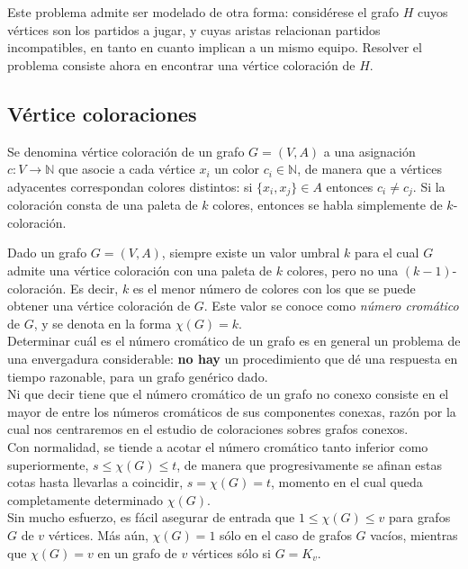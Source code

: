 Este problema admite ser modelado de otra forma: considérese el grafo $H$ cuyos vértices son los partidos a jugar, y cuyas aristas relacionan partidos incompatibles, en tanto en cuanto implican a un mismo equipo. Resolver el problema consiste ahora en encontrar una vértice coloración de $H$.\\

\subsection{Vértice coloraciones}
\label{sec:cromatico}

\begin{fondo}
Se denomina vértice coloración de un grafo $G = (V,A)$ a una asignación $c: V \rightarrow \mathbb{N}$ que asocie a cada vértice $x_i$ un color $c_i \in \mathbb{N}$, de manera que a vértices adyacentes correspondan colores distintos: si $\{x_i,x_j\} \in A$ entonces $c_i \ne c_j$. Si la coloración consta de una paleta de $k$ colores, entonces se habla simplemente de $k$-coloración.
\end{fondo}

Dado un grafo $G = (V,A)$, siempre existe un valor umbral $k$ para el cual $G$ admite una vértice coloración con una paleta de $k$ colores, pero no una $(k-1)$-coloración. Es decir, $k$ es el menor número de colores con los que se puede obtener una vértice coloración de $G$. Este valor se conoce como \emph{número cromático} de $G$, y se denota en la forma $\chi (G) = k$.\\

Determinar cuál es el número cromático de un grafo es en general un problema de una envergadura considerable: \textbf{no hay} un procedimiento que dé una respuesta en tiempo razonable, para un grafo genérico dado.\\

Ni que decir tiene que el número cromático de un grafo no conexo consiste en el mayor de entre los números cromáticos de sus componentes conexas, razón por la cual nos centraremos en el estudio de coloraciones sobres grafos conexos.\\

Con normalidad, se tiende a acotar el número cromático tanto inferior como superiormente, $s \leq \chi (G) \leq t$, de manera que progresivamente se afinan estas cotas hasta llevarlas a coincidir, $s = \chi (G) = t$, momento en el cual queda completamente determinado $\chi (G)$.\\

Sin mucho esfuerzo, es fácil asegurar de entrada que $1 \leq \chi (G) \leq v$ para grafos $G$ de $v$ vértices. Más aún, $\chi (G) = 1$ sólo en el caso de grafos $G$ vacíos, mientras que $\chi (G) = v$ en un grafo de $v$ vértices sólo si $G = K_v$.\\

